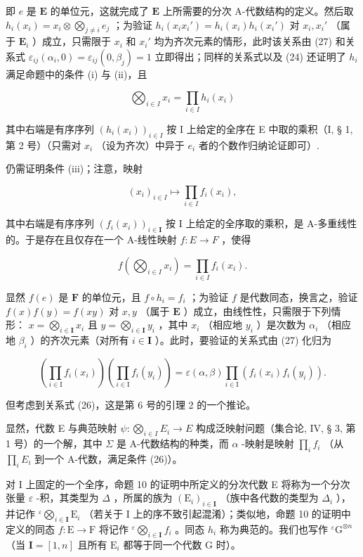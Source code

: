 即 \(e\) 是 \(\mathbf{E}\) 的单位元，这就完成了 \(\mathbf{E}\) 上所需要的分次 A-代数结构的定义。然后取 \(h_i(x_i) = x_i \otimes \bigotimes_{j \neq i} e_j\) ；为验证 \(h_i(x_i x_i') = h_i(x_i) h_i(x_i')\) 对 \(x_i, x_i'\) （属于 \(\mathbf{E}_i\) ）成立，只需限于 \(x_i\) 和 \(x_i'\) 均为齐次元素的情形，此时该关系由 (27) 和关系式 \(\varepsilon_{ij}(\alpha_i, 0) = \varepsilon_{ij}(0, \beta_j) = 1\) 立即得出；同样的关系式以及 (24) 还证明了 \(h_i\) 满足命题中的条件 (i) 与 (ii)，且

\[
\bigotimes_ {i \in I} x _ {i} = \prod_ {i \in I} h _ {i} (x _ {i})\tag{29}
\]

其中右端是有序序列 \((h_i(x_i))_{i\in I}\) 按 I 上给定的全序在 E 中取的乘积（I, § 1, 第 2 号）（只需对 \(x_{i}\) （设为齐次）中异于 \(e_i\) 者的个数作归纳论证即可）.

仍需证明条件 (iii)；注意，映射

\[
(x _ {i}) _ {i \in I} \mapsto \prod_ {i \in I} f _ {i} (x _ {i}),
\]

其中右端是有序序列 \((f_{i}(x_{i}))_{i\in\mathbf{I}}\) 按 I 上给定的全序取的乘积，是 A-多重线性的。于是存在且仅存在一个 A-线性映射 \(f: E \rightarrow F\) ，使得

\[
f \left(\bigotimes_ {i \in I} x _ {i}\right) = \prod_ {i \in I} f _ {i} (x _ {i}).\tag{30}
\]

显然 \(f(e)\) 是 \(\mathbf{F}\) 的单位元，且 \(f \circ h_i = f_i\) ；为验证 \(f\) 是代数同态，换言之，验证 \(f(x)f(y) = f(xy)\) 对 \(x, y\) （属于 \(\mathbf{E}\) ）成立，由线性性，只需限于下列情形： \(x = \bigotimes_{i \in \mathbf{I}} x_i\) 且 \(y = \bigotimes_{i \in \mathbf{I}} y_i\) ，其中 \(x_i\) （相应地 \(y_i\) ）是次数为 \(\alpha_i\) （相应地 \(\beta_i\) ）的齐次元素（对所有 \(i \in \mathbf{I}\) ）。此时，要验证的关系式由 (27) 化归为

\[
\left(\prod_ {i \in \mathrm{I}} f _ {i} (x _ {i})\right) \left(\prod_ {i \in \mathrm{I}} f _ {i} (y _ {i})\right) = \varepsilon (\alpha , \beta) \prod_ {i \in \mathrm{I}} \left(f _ {i} (x _ {i}) f _ {i} (y _ {i})\right).
\]

但考虑到关系式 (26)，这是第 6 号的引理 2 的一个推论。

显然，代数 E 与典范映射 \(\psi: \bigotimes_{i \in I} E_i \to E\) 构成泛映射问题（集合论, IV, § 3, 第 1 号）的一个解，其中 \(\Sigma\) 是 A-代数结构的种类，而 \(\alpha\) -映射是映射 \(\prod_{i} f_i\) （从 \(\prod_{i} E_i\) 到一个 A-代数，满足条件 (26)）。

对 I 上固定的一个全序，命题 10 的证明中所定义的分次代数 E 将称为一个分次张量 \(\varepsilon\) -积，其类型为 \(\Delta\) ，所属的族为 \((\mathrm{E}_i)_{i\in \mathbf{I}}\) （族中各代数的类型为 \(\Delta_i\) ），并记作 \({}^{\varepsilon}\bigotimes_{i\in \mathbf{I}}\mathrm{E}_i\) （若关于 I 上的序不致引起混淆）；类似地，命题 10 的证明中定义的同态 \(f:\mathrm{E}\to \mathrm{F}\) 将记作 \({}^{\varepsilon}\bigotimes_{i\in \mathbf{I}}f_i\) 。同态 \(h_i\) 称为典范的。我们也写作 \({}^{\varepsilon}\mathrm{G}^{\otimes n}\) （当 \(\mathbf{I} = [1,n]\) 且所有 \(\mathrm{E}_i\) 都等于同一个代数 G 时）。


